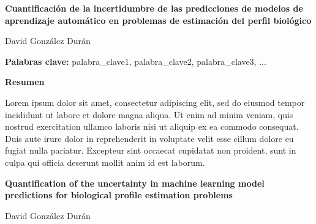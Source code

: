 

%

\cleardoublepage
\thispagestyle{empty}

\begin{center}
    {\large\bfseries Cuantificación de la incertidumbre de las predicciones de modelos de aprendizaje automático en problemas de estimación del perfil biológico}
\end{center}
\begin{center}
    David González Durán
\end{center}

\vspace{0.7cm}

\noindent\textbf{Palabras clave:} palabra\_clave1, palabra\_clave2, palabra\_clave3, ... 

\vspace{0.7cm}

\noindent\textbf{Resumen}

Lorem ipsum dolor sit amet, consectetur adipiscing elit, sed do eiusmod tempor incididunt ut labore et dolore magna aliqua. Ut enim ad minim veniam, quis nostrud exercitation ullamco laboris nisi ut aliquip ex ea commodo consequat. Duis aute irure dolor in reprehenderit in voluptate velit esse cillum dolore eu fugiat nulla pariatur. Excepteur sint occaecat cupidatat non proident, sunt in culpa qui officia deserunt mollit anim id est laborum.


\cleardoublepage
\thispagestyle{empty}

\begin{center}
    {\large\bfseries Quantification of the uncertainty in machine learning model predictions for biological profile estimation problems}
\end{center}
\begin{center}
    David González Durán 
\end{center}

